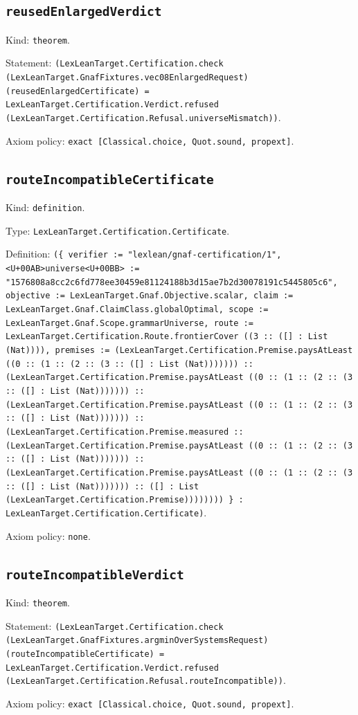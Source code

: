 \documentclass[11pt]{article}
\begin{document}
\subsection*{\texttt{reusedEnlargedVerdict}}
\noindent Kind: \texttt{theorem}.\par
\noindent Statement: \texttt{(LexLeanTarget.Certification.check (LexLeanTarget.GnafFixtures.vec08EnlargedRequest) (reusedEnlargedCertificate) = LexLeanTarget.Certification.Verdict.refused (LexLeanTarget.Certification.Refusal.universeMismatch))}.\par
\noindent Axiom policy: \texttt{exact [Classical.choice, Quot.sound, propext]}.\par
\subsection*{\texttt{routeIncompatibleCertificate}}
\noindent Kind: \texttt{definition}.\par
\noindent Type: \texttt{LexLeanTarget.Certification.Certificate}.\par
\noindent Definition: \texttt{(\{ verifier := "lexlean/gnaf-certification/1", <U+00AB>universe<U+00BB> := "1576808a8cc2c6fd778ee30459e81124188b3d15ae7b2d30078191c5445805c6", objective := LexLeanTarget.Gnaf.Objective.scalar, claim := LexLeanTarget.Gnaf.ClaimClass.globalOptimal, scope := LexLeanTarget.Gnaf.Scope.grammarUniverse, route := LexLeanTarget.Certification.Route.frontierCover ((3 :: ([] : List (Nat)))), premises := (LexLeanTarget.Certification.Premise.paysAtLeast ((0 :: (1 :: (2 :: (3 :: ([] : List (Nat))))))) :: (LexLeanTarget.Certification.Premise.paysAtLeast ((0 :: (1 :: (2 :: (3 :: ([] : List (Nat))))))) :: (LexLeanTarget.Certification.Premise.paysAtLeast ((0 :: (1 :: (2 :: (3 :: ([] : List (Nat))))))) :: (LexLeanTarget.Certification.Premise.measured :: (LexLeanTarget.Certification.Premise.paysAtLeast ((0 :: (1 :: (2 :: (3 :: ([] : List (Nat))))))) :: (LexLeanTarget.Certification.Premise.paysAtLeast ((0 :: (1 :: (2 :: (3 :: ([] : List (Nat))))))) :: ([] : List (LexLeanTarget.Certification.Premise)))))))) \} : LexLeanTarget.Certification.Certificate)}.\par
\noindent Axiom policy: \texttt{none}.\par
\subsection*{\texttt{routeIncompatibleVerdict}}
\noindent Kind: \texttt{theorem}.\par
\noindent Statement: \texttt{(LexLeanTarget.Certification.check (LexLeanTarget.GnafFixtures.argminOverSystemsRequest) (routeIncompatibleCertificate) = LexLeanTarget.Certification.Verdict.refused (LexLeanTarget.Certification.Refusal.routeIncompatible))}.\par
\noindent Axiom policy: \texttt{exact [Classical.choice, Quot.sound, propext]}.\par
\end{document}
